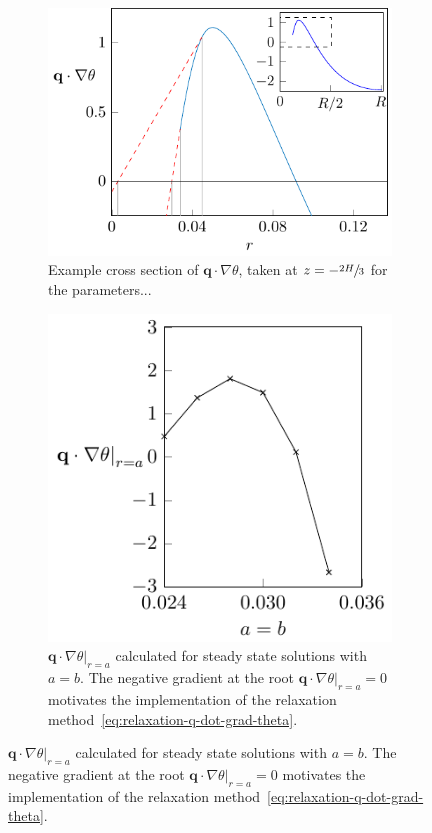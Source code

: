 \documentclass[11pt]{proc}
\begin{document}
\begin{figure}[t!]
\centering
\begin{subfigure}[t]{.48\linewidth}
       \centering
       \includegraphics[width=\textwidth]{q-dot-grad-theta}
       \caption{Example cross section of $ \mathbf{q} \cdot \nabla \theta$, taken at $z=-\sfrac{2H}{3}$ for the parameters...}
       \label{fig:q-dot-grad-theta}
\end{subfigure}
\quad
\begin{subfigure}[t]{.48\linewidth}
       \centering
       \includegraphics[width=\textwidth]{q-dot-grad-theta-root}
       \caption{$ \left. \mathbf{q} \cdot \nabla \theta \right|_{r=a}$ calculated for steady state solutions with $a=b$. The negative gradient at the root $ \left. \mathbf{q} \cdot \nabla \theta \right|_{r=a} = 0$ motivates the implementation of the relaxation method~\eqref{eq:relaxation-q-dot-grad-theta}.}
    \label{fig:q-dot-grad-theta-root}
\end{subfigure}


\end{figure}
\end{document}
